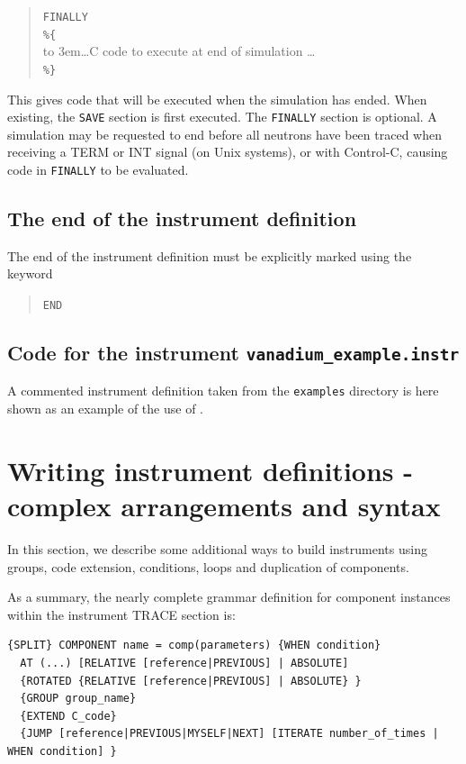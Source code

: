 \begin{quote}
  \texttt{FINALLY} \\
  \verb|%{| \\
  \hbox to 3em{}\ldots C code to execute at end of simulation \ldots \\
  \verb|%}|
\end{quote}
This gives code that will be executed when the simulation has
ended. When existing, the \texttt{SAVE} section is first executed. The
\texttt{FINALLY} section is optional.
A simulation may be requested to end before all neutrons have been
traced when receiving a TERM or INT signal (on Unix systems), or with
Control-C, causing code in \texttt{FINALLY} to be evaluated.
 


\subsection{The end of the instrument definition}
\label{s:end}

The end of the instrument definition must be explicitly marked using the keyword
\begin{quote}
  \texttt{END}
\end{quote}

\subsection{Code for the instrument \texttt{vanadium\_example.instr}}
\label{s:Samples_vanadium.instr}
A commented instrument definition taken from the \texttt{examples} directory is
here shown as an example of the use of \MCS .



\section{Writing instrument definitions - complex arrangements and syntax}
\label{s:instrdefs-extend}

In this section, we describe some additional ways to build instruments using
groups, code extension, conditions, loops and duplication of components.

As a summary, the nearly complete grammar definition for component instances
within the instrument TRACE section is:

\begin{verbatim}
{SPLIT} COMPONENT name = comp(parameters) {WHEN condition}
  AT (...) [RELATIVE [reference|PREVIOUS] | ABSOLUTE]
  {ROTATED {RELATIVE [reference|PREVIOUS] | ABSOLUTE} }
  {GROUP group_name}
  {EXTEND C_code}
  {JUMP [reference|PREVIOUS|MYSELF|NEXT] [ITERATE number_of_times | WHEN condition] }
\end{verbatim}

